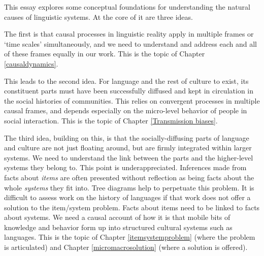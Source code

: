 


This essay explores some conceptual foundations for understanding the natural causes of linguistic systems. At the core of it are three ideas. 

The first is that causal processes in linguistic reality apply in multiple frames or \textquoteleft time scales’ simultaneously, and we need to understand and address each and all of these frames equally in our work. This is the topic of Chapter \ref{causaldynamics}. 

This leads to the second idea. For language and the rest of culture to exist, its constituent parts must have been successfully diffused and kept in circulation in the social histories of communities. This relies on convergent processes in multiple causal frames, and depends especially on the micro-level behavior of people in social interaction. This is the topic of Chapter \ref{Transmission biases}. 

The third idea, building on this, is that the socially-diffusing parts of language and culture are not just floating around, but are firmly integrated within larger systems. We need to understand the link between the parts and the higher-level systems they belong to. This point is underappreciated. Inferences made from facts about \textit{items} are often presented without reflection as being facts about the whole \textit{systems} they fit into. Tree diagrams help to perpetuate this problem. It is difficult to assess work on the history of languages if that work does not offer a solution to the item/system problem. Facts about items need to be linked to facts about systems. We need a causal account of how it is that mobile bits of knowledge and behavior form up into structured cultural systems such as languages. This is the topic of Chapter \ref{itemsystemproblem} (where the problem is articulated) and Chapter \ref{micromacrosolution} (where a solution is offered). 

